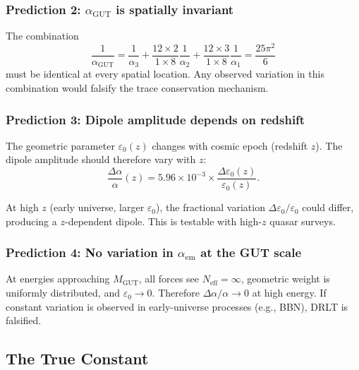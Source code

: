 \documentclass[12pt]{article}
\theoremstyle{remark}
\theoremstyle{definition}
\newcommand{\agut}{\alpha_{\mathrm{GUT}}}
\begin{document}
\subsubsection{Prediction 2: $\agut$ is spatially invariant}

The combination
\begin{equation}
\frac{1}{\agut} = \frac{1}{\alpha_3} + \frac{12 \times 2}{1 \times 8}\frac{1}{\alpha_2} + \frac{12 \times 3}{1 \times 8}\frac{1}{\alpha_1} = \frac{25\pi^2}{6}
\end{equation}
must be identical at every spatial location. Any observed variation in this combination would falsify the trace conservation mechanism.

\subsubsection{Prediction 3: Dipole amplitude depends on redshift}

The geometric parameter $\varepsilon_0(z)$ changes with cosmic epoch (redshift $z$). The dipole amplitude should therefore vary with $z$:
\begin{equation}
\frac{\Delta\alpha}{\alpha}(z) = 5.96 \times 10^{-3} \times \frac{\Delta\varepsilon_0(z)}{\varepsilon_0(z)}.
\end{equation}

At high $z$ (early universe, larger $\varepsilon_0$), the fractional variation $\Delta\varepsilon_0/\varepsilon_0$ could differ, producing a $z$-dependent dipole. This is testable with high-$z$ quasar surveys.

\subsubsection{Prediction 4: No variation in $\alpha_\text{em}$ at the GUT scale}

At energies approaching $M_\text{GUT}$, all forces see $N_\text{eff} = \infty$, geometric weight is uniformly distributed, and $\varepsilon_0 \to 0$. Therefore $\Delta\alpha/\alpha \to 0$ at high energy. If constant variation is observed in early-universe processes (e.g., BBN), DRLT is falsified.

\subsection{The True Constant}
\end{document}
